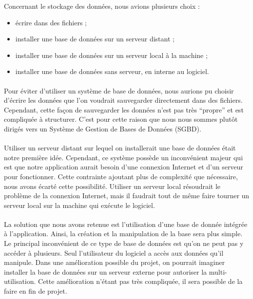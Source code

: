 Concernant le stockage des données, nous avions plusieurs choix :
\begin{itemize}
\item écrire dans des fichiers ;
\item installer une base de données sur un serveur distant ;
\item installer une base de données sur un serveur local à la machine ;
\item installer une base de données sans serveur, en interne au logiciel.
\end{itemize}

\paragraph{}
Pour éviter d’utiliser un système de base de données, nous aurions pu choisir
d’écrire les données que l’on voudrait sauvegarder directement dans des
fichiers. Cependant, cette façon de sauvegarder les données n’est pas très
“propre” et est compliquée à structurer. C’est pour cette raison que nous nous
sommes plutôt dirigés vers un Système de Gestion de Bases de Données (SGBD).

\paragraph{}
Utiliser un serveur distant sur lequel on installerait une base de données
était notre première idée. Cependant, ce système possède un inconvénient
majeur qui est que notre application aurait besoin d’une connexion Internet
et d’un serveur pour fonctionner. Cette contrainte ajoutant plus de complexité
que nécessaire, nous avons écarté cette possibilité. Utiliser un serveur
local résoudrait le problème de la connexion Internet, mais il faudrait tout
de même faire tourner un serveur local sur la machine qui exécute le logiciel.

\paragraph{}
La solution que nous avons retenue est l’utilisation d’une base de donnée
intégrée à l’application. Ainsi, la création et la manipulation de la base
sera plus simple. Le principal inconvénient de ce type de base de données est
qu’on ne peut pas y accéder à plusieurs. Seul l’utilisateur du logiciel a accès
aux données qu’il manipule. Dans une amélioration possible du projet, on
pourrait imaginer installer la base de données sur un serveur externe pour
autoriser la multi-utilisation. Cette amélioration n’étant pas très compliquée,
il sera possible de la faire en fin de projet.

